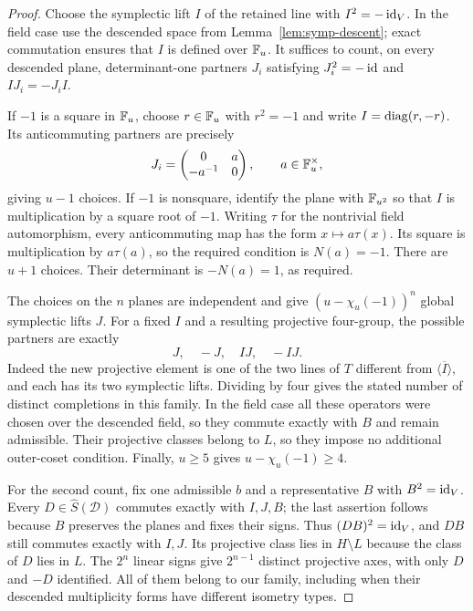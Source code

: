 \begin{proof}
Choose the symplectic lift $I$ of the retained line with
$I^2=-\operatorname{id}_V$.  In the field case use the descended space from
Lemma~\ref{lem:symp-descent}; exact commutation ensures that $I$
is defined over $\mathbb F_u$.  It suffices to count, on every descended
plane, determinant-one partners $J_i$ satisfying
$J_i^2=-\operatorname{id}$ and $IJ_i=-J_iI$.

If $-1$ is a square in $\mathbb F_u$, choose $r\in\mathbb F_u$ with $r^2=-1$
and write $I=\operatorname{diag}(r,-r)$.  Its anticommuting partners are precisely
\[
J_i=\begin{pmatrix}0&a\\-a^{-1}&0\end{pmatrix},
\qquad a\in\mathbb F_u^\times,
\]
giving $u-1$ choices.  If $-1$ is nonsquare, identify the plane with
$\mathbb F_{u^2}$ so that $I$ is multiplication by a square root of $-1$.
Writing $\tau$ for the nontrivial field automorphism, every
anticommuting map has the form $x\mapsto a\tau(x)$.  Its square is
multiplication by $a\tau(a)$, so the required condition is
$N(a)=-1$.  There are $u+1$ choices.  Their determinant is
$-N(a)=1$, as required.

The choices on the $n$ planes are independent and give
$(u-\chi_u(-1))^n$ global symplectic lifts $J$.  For a fixed $I$
and a resulting projective four-group, the possible partners are
exactly
\[
J,\quad -J,\quad IJ,\quad -IJ.
\]
Indeed the new projective element is one of the two lines of $T$
different from $\langle\overline I\rangle$, and each has its two
symplectic lifts.  Dividing by four gives the stated number of
distinct completions in this family.  In the field case all these
operators were chosen over the descended field, so they commute
exactly with $B$ and remain admissible.  Their projective classes
belong to $L$, so they impose no additional outer-coset condition.
Finally, $u\geq5$ gives $u-\chi_u(-1)\geq4$.

For the second count, fix one admissible $b$ and a representative
$B$ with $B^2=\operatorname{id}_V$.  Every
$D\in\widehat S(\mathcal D)$ commutes exactly with $I,J,B$;
the last assertion follows because $B$ preserves the planes and
fixes their signs.  Thus $(DB)^2=\operatorname{id}_V$, and $DB$ still commutes
exactly with $I,J$.  Its projective class lies in $H\setminus L$
because the class of $D$ lies in $L$.  The $2^n$ linear signs give
$2^{n-1}$ distinct projective axes, with only $D$ and $-D$
identified.  All of them belong to our family, including when their
descended multiplicity forms have different isometry types.
\end{proof}

